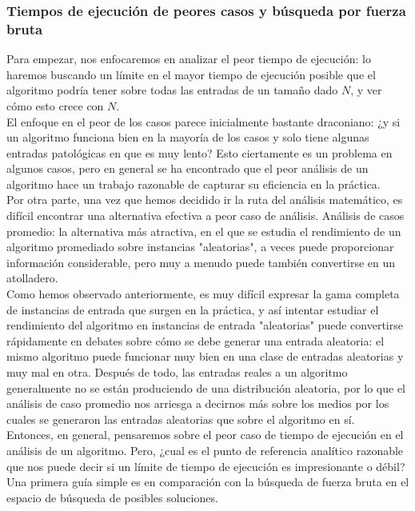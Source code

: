 \documentclass[a4paper]{article}
\begin{document}
\subsubsection*{Tiempos de ejecución de peores casos y búsqueda por fuerza bruta} 

Para empezar, nos enfocaremos en analizar el peor tiempo de ejecución: lo haremos buscando un límite en el mayor tiempo de ejecución posible que el algoritmo podría tener sobre todas las entradas de un tamaño dado $N$, y ver cómo esto crece con $N$. \\

El enfoque en el peor de los casos parece inicialmente bastante draconiano: ¿y si un algoritmo funciona bien en la mayoría de los casos y solo tiene algunas entradas patológicas en que es muy lento? Esto ciertamente es un problema en algunos casos, pero en general se ha encontrado que el peor análisis de un algoritmo hace un trabajo razonable de capturar su eficiencia en la práctica. \\

Por otra parte, una vez que hemos decidido ir la ruta del análisis matemático, es difícil encontrar una alternativa efectiva a peor caso de análisis. 
Análisis de casos promedio: la alternativa más atractiva, en el que se estudia el rendimiento de un algoritmo promediado sobre instancias "aleatorias", a veces puede proporcionar información considerable, pero muy a menudo puede también convertirse en un atolladero. \\

Como hemos observado anteriormente, es muy difícil expresar la gama completa de instancias de entrada que surgen en la práctica, y así intentar estudiar el rendimiento del algoritmo en instancias de entrada "aleatorias" puede convertirse rápidamente en debates sobre cómo se debe generar una entrada aleatoria: el mismo algoritmo puede funcionar muy bien en una clase de entradas aleatorias y muy mal en otra. Después de todo, las entradas reales a un algoritmo generalmente no se están produciendo de una distribución aleatoria, por lo que el análisis de caso promedio nos arriesga a decirnos más sobre los medios por los cuales se generaron las entradas aleatorias que sobre el algoritmo en sí. \\

Entonces, en general, pensaremos sobre el peor caso de tiempo de ejecución en el análisis de un algoritmo. Pero, ¿cual es el punto de referencia analítico razonable que nos puede decir si un límite de tiempo de ejecución es impresionante o débil? Una primera guía simple es en comparación con la búsqueda de fuerza bruta en el espacio de búsqueda de posibles soluciones. \\
\end{document}
